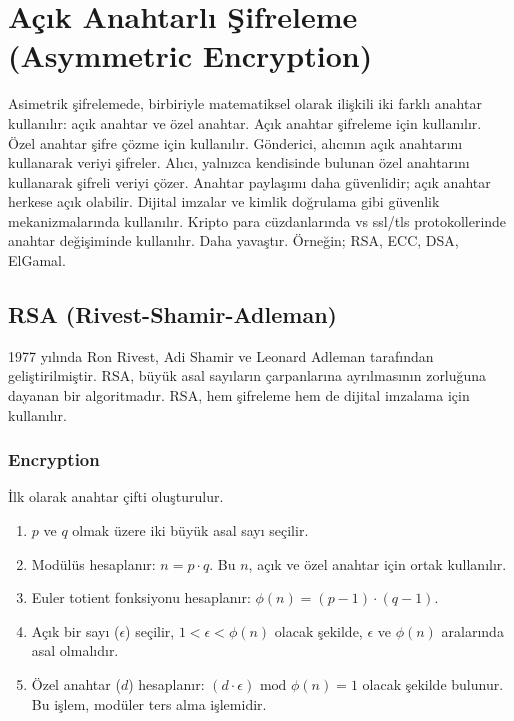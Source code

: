 \section{Açık Anahtarlı Şifreleme (Asymmetric Encryption)}

Asimetrik şifrelemede, birbiriyle matematiksel olarak ilişkili iki farklı anahtar kullanılır: açık anahtar ve özel anahtar. Açık anahtar şifreleme için kullanılır. Özel anahtar şifre çözme için kullanılır. Gönderici, alıcının açık anahtarını kullanarak veriyi şifreler. Alıcı, yalnızca kendisinde bulunan özel anahtarını kullanarak şifreli veriyi çözer. Anahtar paylaşımı daha güvenlidir; açık anahtar herkese açık olabilir. Dijital imzalar ve kimlik doğrulama gibi güvenlik mekanizmalarında kullanılır. Kripto para cüzdanlarında vs ssl/tls protokollerinde anahtar değişiminde kullanılır. Daha yavaştır. Örneğin; RSA, ECC, DSA, ElGamal.

\subsection{RSA (Rivest-Shamir-Adleman)}

1977 yılında Ron Rivest, Adi Shamir ve Leonard Adleman tarafından geliştirilmiştir. RSA, büyük asal sayıların çarpanlarına ayrılmasının zorluğuna dayanan bir algoritmadır. RSA, hem şifreleme hem de dijital imzalama için kullanılır. 

\subsubsection{Encryption}

İlk olarak anahtar çifti oluşturulur.

\begin{enumerate}
    \item $p$ ve $q$ olmak üzere iki büyük asal sayı seçilir.
    \item Modülüs hesaplanır: $n = p \cdot q$. Bu $n$, açık ve özel anahtar için ortak kullanılır.
    \item Euler totient fonksiyonu hesaplanır: $\phi(n) = (p - 1) \cdot (q - 1)$.
    \item Açık bir sayı ($\epsilon$) seçilir, $1 < \epsilon < \phi(n)$ olacak şekilde, $\epsilon$ ve $\phi(n)$ aralarında asal olmalıdır.
    \item Özel anahtar ($d$) hesaplanır: $(d \cdot \epsilon) \text{ mod } \phi(n) = 1$ olacak şekilde bulunur. Bu işlem, modüler ters alma işlemidir.
\end{enumerate}

